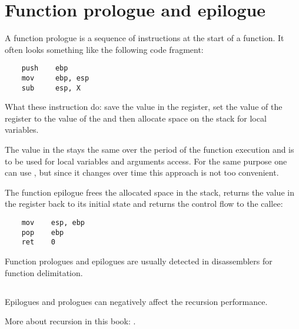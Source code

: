 \chapter{Function prologue and epilogue}
\label{sec:prologepilog}

A function prologue is a sequence of instructions at the start of a function. It often looks something like the following code fragment:

\begin{lstlisting}
    push    ebp
    mov     ebp, esp
    sub     esp, X
\end{lstlisting}

What these instruction do: save the value in the \EBP register,
set the value of the \EBP register to the value of the \ESP and then allocate space on the stack 
for local variables.

The value in the \EBP stays the same over the period of the function execution and is to be used for local variables and 
arguments access. 
For the same purpose one can use \ESP, but since it changes over time this approach is not too convenient.

The function epilogue frees the allocated space in the stack, returns the value in the \EBP register back to its initial state 
and returns the control flow to the \gls{callee}:

\begin{lstlisting}
    mov    esp, ebp
    pop    ebp
    ret    0
\end{lstlisting}

Function prologues and epilogues are usually detected in disassemblers for function delimitation.

\section{\Recursion}

\myindex{\Recursion}
Epilogues and prologues can negatively affect the recursion performance.

More about recursion in this book: .

